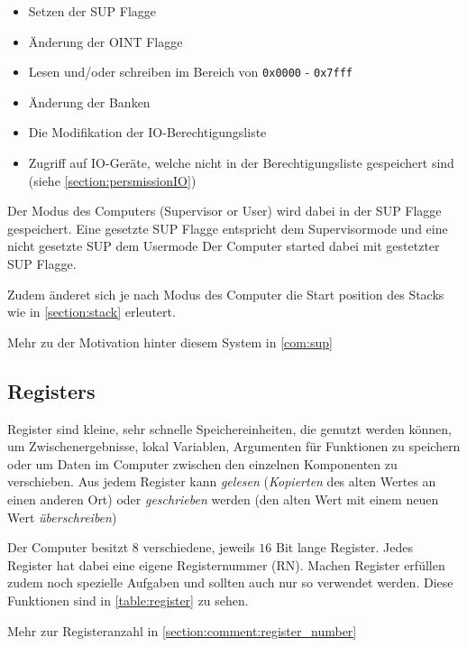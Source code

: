\documentclass{scrartcl}
\begin{document}
\begin{itemize}
	\item Setzen der SUP Flagge
	\item Änderung der OINT Flagge
	\item Lesen und/oder schreiben im Bereich von \texttt{0x0000} - \texttt{0x7fff}
	\item Änderung der Banken
	\item Die Modifikation der IO-Berechtigungsliste
	\item Zugriff auf IO-Geräte, welche nicht in der Berechtigungsliste gespeichert sind (siehe \autoref{section:persmissionIO})
\end{itemize}

Der Modus des Computers (Supervisor or User) wird dabei in der SUP Flagge gespeichert. Eine gesetzte SUP Flagge entspricht dem Supervisormode und eine nicht gesetzte SUP dem Usermode Der Computer started dabei mit gestetzter SUP Flagge.

Zudem änderet sich je nach Modus des Computer die Start position des Stacks wie in \autoref{section:stack} erleutert.

Mehr zu der Motivation hinter diesem System in \autoref{com:sup}



\subsection{Registers}
Register sind kleine, sehr schnelle Speichereinheiten, die genutzt werden können, um Zwischenergebnisse, lokal Variablen, Argumenten für Funktionen zu speichern oder um Daten im Computer zwischen den einzelnen Komponenten zu verschieben. Aus jedem Register kann \emph{gelesen} (\emph{Kopierten} des alten Wertes an einen anderen Ort) oder \emph{geschrieben} werden (den alten Wert mit einem neuen Wert \emph{überschreiben})

Der Computer besitzt $8$ verschiedene, jeweils $16$ Bit lange Register. Jedes Register hat dabei eine eigene Registernummer (RN). Machen Register erfüllen zudem noch spezielle Aufgaben und sollten auch nur so verwendet werden. Diese Funktionen sind in \autoref{table:register} zu sehen.

Mehr zur Registeranzahl in \autoref{section:comment:register_number}
\end{document}

